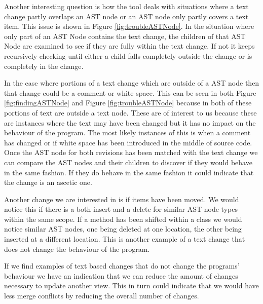 Another interesting question is how the tool deals with situations where a text change partly overlaps an AST node or an AST node only partly covers a text item.  This issue is shown in Figure \ref{fig:troubleASTNode}. In the situation where only part of an AST Node contains the text change, the children of that AST Node are examined to see if they are fully within the text change.  If not it keeps recursively checking until either a child falls completely outside the change or is completely in the change.  

In the case where portions of a text change which are outside of a AST node then that change could be a comment or white space. This can be seen in both Figure \ref{fig:findingASTNode} and Figure \ref{fig:troubleASTNode} because in both of these portions of text are outside a text node.  These are of interest to us because these are instances where the text may have been changed but it has no impact on the behaviour of the program.  The most likely instances of this is when a comment has changed or if white space has been introduced in the middle of source code. Once the AST node for both revisions has been matched with the text change we can compare the AST nodes and their children to discover if they would behave in the same fashion. If they do behave in the same fashion it could indicate that the change is an ascetic one.

Another change we are interested in is if items have been moved.  We would notice this if there is a both insert and a delete for similar AST node types within the same scope.  If a method has been shifted within a class we would notice similar AST nodes, one being deleted at one location, the other being inserted at a different location.  This is another example of a text change that does not change the behaviour of the program.


If we find examples of text based changes that do not change the programs' behaviour we have an indication that we can reduce the amount of changes necessary to update another view. This in turn could indicate that we would have less merge conflicts by reducing the overall number of changes.

% 

